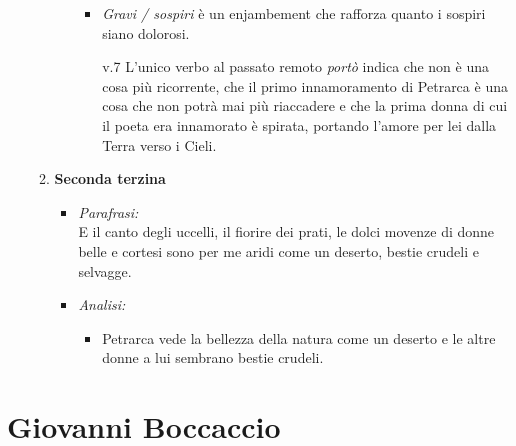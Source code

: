 \documentclass{article}
\begin{document}
\begin{enumerate}
\begin{enumerate}[label=]
\begin{itemize}[label=]
\begin{itemize}
                            \item \textit{Gravi / sospiri} è un enjambement che rafforza quanto i sospiri siano dolorosi.
                            \item [v.7] L'unico verbo al passato remoto \textit{portò} indica che non è una cosa più ricorrente, che il primo innamoramento di Petrarca è una cosa che non potrà mai più riaccadere e che la prima donna di cui il poeta era innamorato è spirata, portando l'amore per lei dalla Terra verso i Cieli.
                        \end{itemize}
                \end{itemize}
            \item \textbf{Seconda terzina}
                \begin{itemize}[label=]
                    \item \textit{Parafrasi:}\\
                        E il canto degli uccelli, il fiorire dei prati, le dolci movenze di donne belle e cortesi sono per me aridi come un deserto, bestie crudeli e selvagge.
                    \item \textit{Analisi:}
                        \begin{itemize}
                            \item Petrarca vede la bellezza della natura come un deserto e le altre donne a lui sembrano bestie crudeli.
                        \end{itemize}
                \end{itemize}
        \end{enumerate}
\end{enumerate}

\newpage
\section{Giovanni Boccaccio}
\end{document}
